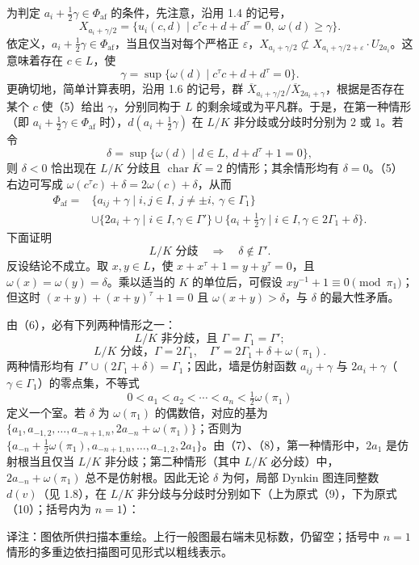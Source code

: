 为判定 $a_i+\frac12\gamma\in\Phi_{\mathrm{af}}$ 的条件，先注意，沿用 1.4 的记号，
\[
X_{a_i+\gamma/2}=\{u_i(c,d)\mid c^\tau c+d+d^\tau=0,\ \omega(d)\geq\gamma\}.
\]
依定义，$a_i+\frac12\gamma\in\Phi_{\mathrm{af}}$，当且仅当对每个严格正 $\varepsilon$，$X_{a_i+\gamma/2}\not\subset X_{a_i+\gamma/2+\varepsilon}\cdot U_{2a_i}$。这意味着存在 $c\in L$，使
\[
\gamma=\sup\{\omega(d)\mid c^\tau c+d+d^\tau=0\}.\tag{1.15(5)}
\]
更确切地，简单计算表明，沿用 1.6 的记号，群 $\overline X_{a_i+\gamma/2}/\overline X_{2a_i+\gamma}$，根据是否存在某个 $c$ 使（5）给出 $\gamma$，分别同构于 $L$ 的剩余域或为平凡群。于是，在第一种情形（即 $a_i+\frac12\gamma\in\Phi_{\mathrm{af}}$ 时），$d(a_i+\frac12\gamma)$ 在 $L/K$ 非分歧或分歧时分别为 $2$ 或 $1$。若令
\[
\delta=\sup\{\omega(d)\mid d\in L,\ d+d^\tau+1=0\},
\]
则 $\delta<0$ 恰出现在 $L/K$ 分歧且 $\operatorname{char}\overline K=2$ 的情形；其余情形均有 $\delta=0$。（5）右边可写成 $\omega(c^\tau c)+\delta=2\omega(c)+\delta$，从而
\[
\begin{aligned}
\Phi_{\mathrm{af}}={}&\{a_{ij}+\gamma\mid i,j\in I,\ j\ne\pm i,\ \gamma\in\Gamma_1\}\\
&\cup\{2a_i+\gamma\mid i\in I,\gamma\in\Gamma'\}
\cup\{a_i+\tfrac12\gamma\mid i\in I,\gamma\in2\Gamma_1+\delta\}.
\end{aligned}
\]
下面证明
\[
L/K\text{ 分歧}\quad\Longrightarrow\quad\delta\notin\Gamma'.\tag{1.15(6)}
\]
反设结论不成立。取 $x,y\in L$，使 $x+x^\tau+1=y+y^\tau=0$，且 $\omega(x)=\omega(y)=\delta$。乘以适当的 $K$ 的单位后，可假设 $xy^{-1}+1\equiv0\pmod{\pi_1}$；但这时 $(x+y)+(x+y)^\tau+1=0$ 且 $\omega(x+y)>\delta$，与 $\delta$ 的最大性矛盾。

由（6），必有下列两种情形之一：
\[
L/K\text{ 非分歧，且 }\Gamma=\Gamma_1=\Gamma';\tag{1.15(7)}
\]
\[
L/K\text{ 分歧，}\Gamma=2\Gamma_1,\quad\Gamma'=2\Gamma_1+\delta+\omega(\pi_1).\tag{1.15(8)}
\]
两种情形均有 $\Gamma'\cup(2\Gamma_1+\delta)=\Gamma_1$；因此，墙是仿射函数 $a_{ij}+\gamma$ 与 $2a_i+\gamma$（$\gamma\in\Gamma_1$）的零点集，不等式
\[
0<a_1<a_2<\cdots<a_n<\tfrac12\omega(\pi_1)
\]
定义一个室。若 $\delta$ 为 $\omega(\pi_1)$ 的偶数倍，对应的基为 $\{a_1,a_{-1,2},\ldots,a_{-n+1,n},2a_{-n}+\omega(\pi_1)\}$；否则为 $\{a_{-n}+\frac12\omega(\pi_1),a_{-n+1,n},\ldots,a_{-1,2},2a_1\}$。由（7）、（8），第一种情形中，$2a_1$ 是仿射根当且仅当 $L/K$ 非分歧；第二种情形（其中 $L/K$ 必分歧）中，$2a_{-n}+\omega(\pi_1)$ 总不是仿射根。因此无论 $\delta$ 为何，局部 Dynkin 图连同整数 $d(v)$（见 1.8），在 $L/K$ 非分歧与分歧时分别如下（上为原式（9），下为原式（10）；括号内为 $n=1$）：
\begin{center}\end{center}
\noindent 译注：图依所供扫描本重绘。上行一般图最右端未见标数，仍留空；括号中 $n=1$ 情形的多重边依扫描图可见形式以粗线表示。

